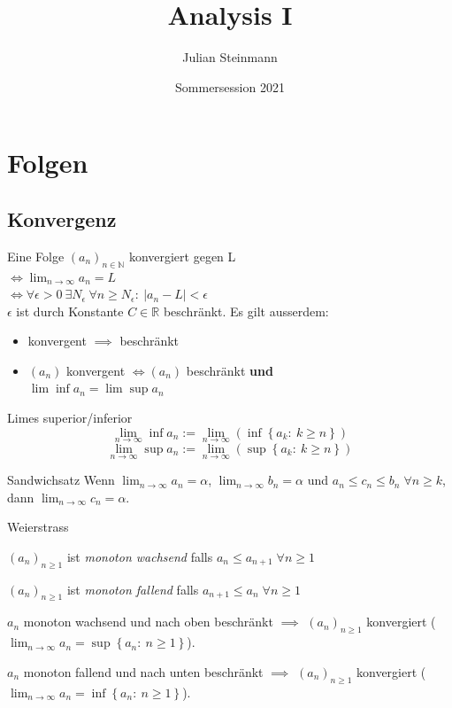 \documentclass[a4paper,10pt]{article}
\title{Analysis I}
\author{Julian Steinmann}
\date{Sommersession 2021}
\def\limn{\lim_{n\to \infty}}
\def\R{\mathbb{R}}
\begin{document}
\maketitle



\section{Folgen}
\subsection{Konvergenz}
Eine Folge $(a_n)_{n\in \mathbb{N}}$ konvergiert gegen L \\ $\iff \lim_{n \to \infty} a_n = L $ \\ $\iff \forall \epsilon > 0 \ \exists N_\epsilon \ \forall n \ge N_\epsilon : \ | a_n - L | < \epsilon$\\

$\epsilon$ ist durch Konstante $C \in \R$ beschränkt.
Es gilt ausserdem:
\begin{itemize}
 \item konvergent $\implies$ beschränkt
 \item $(a_n)$ konvergent $\iff (a_n)$ beschränkt \textbf{und} \\$\lim \inf a_n = \lim \sup a_n$
\end{itemize}


\begin{subbox}{Limes superior/inferior}
\[ \limn \inf a_n := \limn \left( \inf \left\{ a_k : \: k \geq n \right\} \right) \]
\[ \limn \sup a_n := \limn \left( \sup \left\{ a_k : \: k \geq n \right\} \right) \]
\end{subbox}

\begin{subbox}{Sandwichsatz}
Wenn $\limn a_n = \alpha$, $\limn b_n = \alpha$ und $a_n \le c_n \le b_n \; \forall n \ge k$, dann $\limn c_n = \alpha$.
\end{subbox}

\begin{mainbox}{Weierstrass}
\begin{subbox}{}
$(a_n)_{n \geq 1}$ ist \emph{monoton wachsend} falls $a_n \leq a_{n+1} \; \forall n \geq 1$

$(a_n)_{n \geq 1}$ ist \emph{monoton fallend} falls $a_{n+1} \leq a_n \; \forall n \geq 1$
\end{subbox}
$a_n$ monoton wachsend und nach oben beschränkt $\implies$ $(a_n)_{n \geq 1}$ konvergiert ($\limn a_n = \sup \left\{ a_n : \ n \ge 1 \right\}$).

$a_n$ monoton fallend und nach unten beschränkt $\implies$ $(a_n)_{n \geq 1}$ konvergiert ($\limn a_n = \inf \left\{ a_n : \ n \ge 1 \right\}$).
\end{mainbox}
\end{document}
